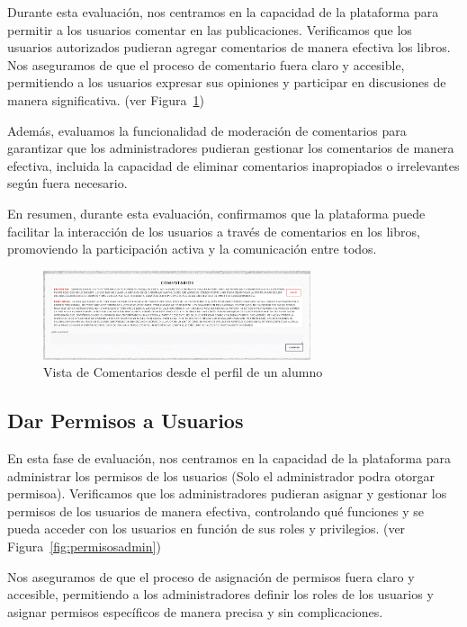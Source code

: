 \documentclass[a4paper, 12pt]{book}
\begin{document}
Durante esta evaluación, nos centramos en la capacidad de la plataforma para permitir a los usuarios comentar en las publicaciones. Verificamos que los usuarios 
autorizados pudieran agregar comentarios de manera efectiva los libros. Nos aseguramos de que el proceso de comentario fuera claro y accesible, permitiendo a los 
usuarios expresar sus opiniones y participar en discusiones de manera significativa. (ver Figura~\ref{fig:comentarios})

Además, evaluamos la funcionalidad de moderación de comentarios para garantizar que los administradores pudieran gestionar los comentarios de manera efectiva, 
incluida la capacidad de eliminar comentarios inapropiados o irrelevantes según fuera necesario.

En resumen, durante esta evaluación, confirmamos que la plataforma puede facilitar la interacción de los usuarios a través de comentarios en los libros, 
promoviendo la participación activa y la comunicación entre todos.

\begin{figure}
  \centering
  \includegraphics[width=0.7\textwidth]{img/comentarios.png}
  \caption{Vista de Comentarios desde el perfil de un alumno}
  \label{fig:comentarios}
\end{figure}
\subsection{Dar Permisos a Usuarios}
\label{sec:grant-permissions-users}

En esta fase de evaluación, nos centramos en la capacidad de la plataforma para administrar los permisos de los usuarios (Solo el administrador podra otorgar permisoa). 
Verificamos que los administradores pudieran asignar y gestionar los permisos de los usuarios de manera efectiva, controlando qué funciones y se pueda 
acceder con los usuarios en función de sus roles y privilegios. (ver Figura~\ref{fig:permisosadmin})

Nos aseguramos de que el proceso de asignación de permisos fuera claro y accesible, permitiendo a los administradores definir los roles de los usuarios y asignar 
permisos específicos de manera precisa y sin complicaciones.
\end{document}
